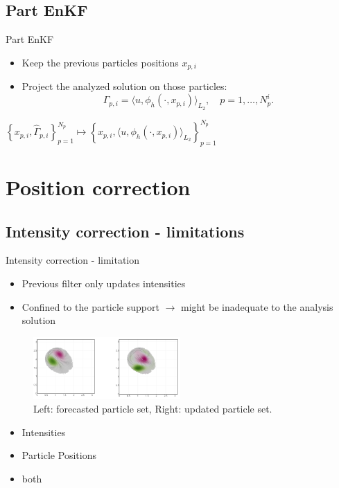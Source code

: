 \documentclass[aspectratio=169]{beamer} %
\begin{document}
\subsection{Part EnKF}
\begin{frame}{Part EnKF}
    \subtitle{Project solution on each forecast configuration}
    \begin{itemize}
        \item Keep the previous particles positions $x_{p, i}$
        \item Project the analyzed solution on those particles: \\
              \begin{equation*}
                  \Gamma_{p, i} = \langle u, \phi_h(\cdot,x_{p,i})\rangle_{L_2}, \quad p = 1, \dots, N_p^i.
              \end{equation*}
    \end{itemize}
    \vfill
    \centering
    $\left\{x_{p,i}, \hat \Gamma_{p,i}\right\}_{p=1}^{N_p} \mapsto \left\{x_{p,i}, \langle u, \phi_h(\cdot,x_{p,i})\rangle_{L_2} \right\}_{p=1}^{N_p}$
\end{frame}

\section{Position correction}
\subsection{Intensity correction - limitations}
\begin{frame}{Intensity correction - limitation}
    \begin{itemize}
        \item Previous filter only updates intensities
        \item Confined to the particle support $\rightarrow$ might be inadequate to the analysis solution

    \end{itemize}

    \begin{figure}
        \centering
        \includegraphics[width=0.5\textwidth]{images/unalign_discretization.png}
        \caption{Left: forecasted particle set, Right: updated particle set.}
    \end{figure}

    \begin{itemize}
        \item<2->Intensities
        \item<2-> \textcolor{ceared}{Particle Positions}
        \item<2-> both
    \end{itemize}
\end{frame}
\end{document}
